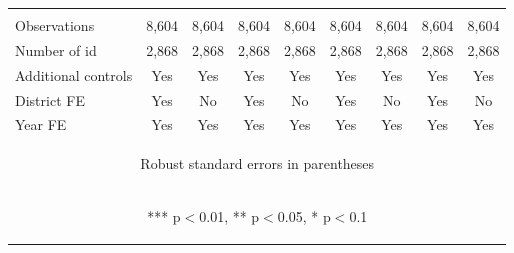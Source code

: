 \begin{center}
\begin{tabular}{lcccccccc}
\vspace{4pt} & \begin{footnotesize}\end{footnotesize} & \begin{footnotesize}\end{footnotesize} & \begin{footnotesize}\end{footnotesize} & \begin{footnotesize}\end{footnotesize} & \begin{footnotesize}\end{footnotesize} & \begin{footnotesize}\end{footnotesize} & \begin{footnotesize}\end{footnotesize} & \begin{footnotesize}\end{footnotesize} \\
Observations & 8,604 & 8,604 & 8,604 & 8,604 & 8,604 & 8,604 & 8,604 & 8,604 \\
Number of id & 2,868 & 2,868 & 2,868 & 2,868 & 2,868 & 2,868 & 2,868 & 2,868 \\
Additional controls & Yes & Yes & Yes & Yes & Yes & Yes & Yes & Yes \\
District FE & Yes & No & Yes & No & Yes & No & Yes & No \\
 Year FE & Yes & Yes & Yes & Yes & Yes & Yes & Yes & Yes \\ \hline
\multicolumn{9}{c}{\begin{footnotesize} Robust standard errors in parentheses\end{footnotesize}} \\
\multicolumn{9}{c}{\begin{footnotesize} *** p$<$0.01, ** p$<$0.05, * p$<$0.1\end{footnotesize}} \\
\end{tabular}
\end{center}
